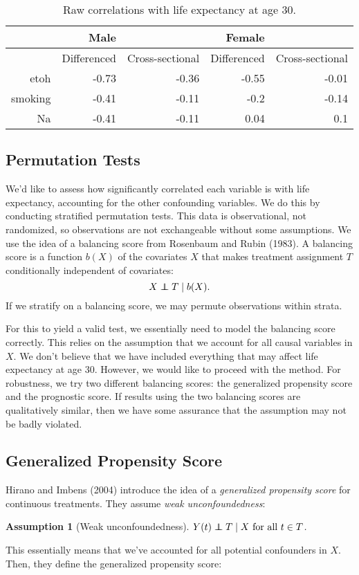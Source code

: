 \documentclass[11pt]{article}\usepackage[]{graphicx}\usepackage[]{color}
\newtheorem{assumption}{Assumption}
\newcommand\independent{\protect\mathpalette{\protect\independenT}{\perp}}
\def\independenT#1#2{\mathrel{\rlap{$#1#2$}\mkern2mu{#1#2}}}
\begin{document}
\begin{table}[ht]
\centering
\begin{tabular}{r|rr|rr}
   \hline
 & Male &  & Female &  \\ 
   \hline
   & Differenced & Cross-sectional & Differenced & Cross-sectional \\ 
   \hline
etoh & -0.73 & -0.36 & -0.55 & -0.01 \\ 
  smoking & -0.41 & -0.11 & -0.2 & -0.14 \\ 
  Na & -0.41 & -0.11 & 0.04 & 0.1 \\ 
   \hline
\end{tabular}
\caption{Raw correlations with life expectancy at age 30.} 
\label{tab:raw_corr}
\end{table}


\subsection{Permutation Tests}
We'd like to assess how significantly correlated each variable is with life expectancy, accounting for the other confounding variables.
We do this by conducting stratified permutation tests.
This data is observational, not randomized, so observations are not exchangeable without some assumptions.
We use the idea of a balancing score from Rosenbaum and Rubin (1983).
A balancing score is a function $b(X)$ of the covariates $X$ that makes treatment assignment $T$ conditionally independent of covariates:
$$X \independent T \mid b(X).$$
If we stratify on a balancing score, we may permute observations within strata.

For this to yield a valid test, we essentially need to model the balancing score correctly.
This relies on the assumption that we account for all causal variables in $X$.
We don't believe that we have included everything that may affect life expectancy at age 30.
However, we would like to proceed with the method.
For robustness, we try two different balancing scores: the generalized propensity score and the prognostic score.
If results using the two balancing scores are qualitatively similar, then we have some assurance that the assumption may not be badly violated.

\subsection{Generalized Propensity Score}
Hirano and Imbens (2004) introduce the idea of a \textit{generalized propensity score} for continuous treatments.
They assume \textit{weak unconfoundedness}:
\begin{assumption}[Weak unconfoundedness] $Y(t) \independent T \mid X \text{ for all } t \in T$.
\end{assumption}
This essentially means that we've accounted for all potential confounders in $X$.
Then, they define the generalized propensity score:
\end{document}
